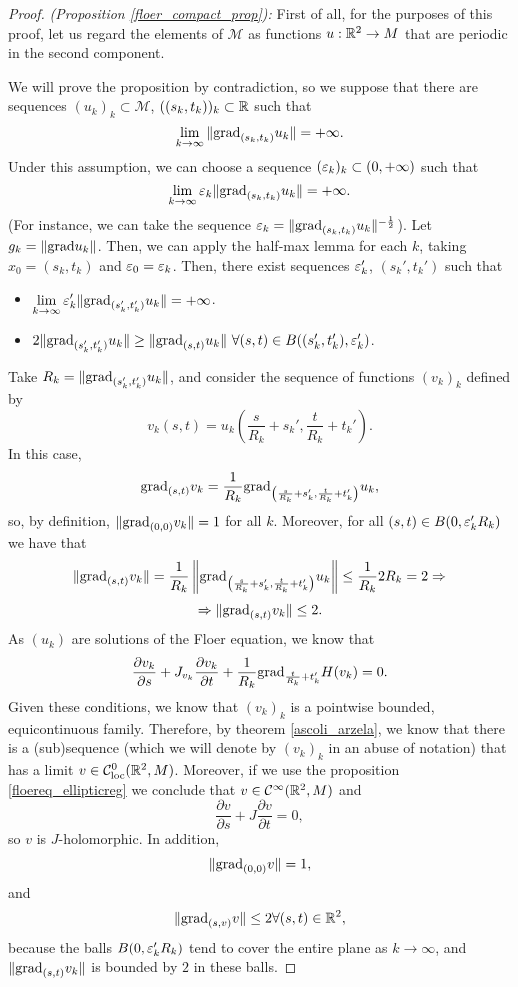\begin{proof} {\it (Proposition \ref{floer_compact_prop}):} First of all, for the purposes of this proof, let us regard the elements of $\mathcal{M}$ as functions $u : \mathbb{R}^2 \rightarrow M$ that are periodic in the second component.

We will prove the proposition by contradiction, so we suppose that there are sequences $(u_k)_k \subset \mathcal{M}$, $((s_k,t_k))_k \subset \mathbb{R}$ such that
\[\lim_{k\rightarrow \infty} \|\mathrm{grad}_{(s_k,t_k)}u_k\| = +\infty .\]
Under this assumption, we can choose a sequence $(\varepsilon_k)_k \subset (0,+\infty)$ such that
\[\lim_{k\rightarrow \infty} \varepsilon_k \|\mathrm{grad}_{(s_k,t_k)}u_k\| = +\infty .\]
(For instance, we can take the sequence $\varepsilon_k = \|\mathrm{grad}_{(s_k,t_k)}u_k\|^{-\frac12}$).
Let $g_k = \|\mathrm{grad} u_k\|$. Then, we can apply the half-max lemma for each $k$, taking $x_0 = (s_k,t_k)$ and $\varepsilon_0 = \varepsilon_k$. Then, there exist sequences $\varepsilon_k'$, $(s_k',t_k')$ such that
\begin{itemize}
	\item $\displaystyle\lim_{k\rightarrow \infty}\varepsilon_k'\|\mathrm{grad}_{(s_k',t_k')}u_k\| = +\infty$.
	\item $2\|\mathrm{grad}_{(s_k',t_k')}u_k\| \geq \|\mathrm{grad}_{(s,t)}u_k\| \ \forall (s,t) \in B((s_k',t_k'),\varepsilon_k')$.
\end{itemize}

Take $R_k = \|\mathrm{grad}_{(s_k',t_k')}u_k\|$, and consider the sequence of functions $(v_k)_k$ defined by
\[v_k(s,t) = u_k \left(\frac{s}{R_k}+s_k', \frac{t}{R_k}+t_k' \right) .\]
In this case,
\[\mathrm{grad}_{(s,t)}v_k = \frac1{R_k} \mathrm{grad}_{\left( \frac{s}{R_k} + s_k', \frac{t}{R_k} + t_k' \right)} u_k ,\]
so, by definition, $\|\mathrm{grad}_{(0,0)}v_k\|=1$ for all $k$. Moreover, for all $(s,t) \in B(0,\varepsilon_k'R_k)$ we have that
\[\|\mathrm{grad}_{(s,t)}v_k\| = \frac1{R_k} \left\|\mathrm{grad}_{\left( \frac{s}{R_k}+s_k', \frac{t}{R_k} + t_k' \right)}u_k \right\| \leq \frac1{R_k} 2R_k = 2 \Rightarrow \]
\[\Rightarrow \|\mathrm{grad}_{(s,t)}v_k\| \leq 2 .\]
As $(u_k)$ are solutions of the Floer equation, we know that
\[\frac{\partial v_k}{\partial s} + J_{v_k} \frac{\partial v_k}{\partial t} + \frac1{R_k} \mathrm{grad}_{\frac{t}{R_k} + t_k'}H(v_k) = 0 .\]
Given these conditions, we know that $(v_k)_k$ is a pointwise bounded, equicontinuous family. Therefore, by theorem \ref{ascoli_arzela}, we know that there is a (sub)sequence (which we will denote by $(v_k)_k$ in an abuse of notation) that has a limit $v \in \mathcal{C}_{\text{loc}}^0(\mathbb{R}^2,M)$. Moreover, if we use the proposition \ref{floereq_ellipticreg} we conclude that $v \in \mathcal{C}^{\infty}(\mathbb{R}^2,M)$ and
\[\frac{\partial v}{\partial s} + J \frac{\partial v}{\partial t} = 0,\]
so $v$ is $J$-holomorphic. In addition,
\[\|\mathrm{grad}_{(0,0)}v\| = 1 ,\]
and
\[\|\mathrm{grad}_{(s,v)}v\| \leq 2 \forall (s,t) \in \mathbb{R}^2,\]
because the balls $B(0,\varepsilon_k'R_k)$ tend to cover the entire plane as $k \rightarrow \infty$, and $\|\mathrm{grad}_{(s,t)}v_k\|$ is bounded by $2$ in these balls.


\end{proof}
